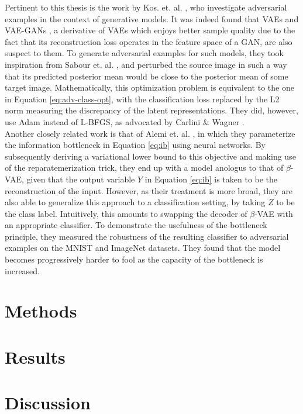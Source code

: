 \documentclass{report}
\begin{document}
\noindent Pertinent to this thesis is the work by Kos. et. al. \cite{kos-gen-adv}, who investigate adversarial examples in the context of generative models. It was indeed found that VAEs and VAE-GANs \cite{vaegan}, a derivative of VAEs which enjoys better sample quality due to the fact that its reconstruction loss operates in the feature space of a GAN, are also suspect to them. To generate adversarial examples for such models, they took inspiration from Sabour et. al. \cite{sabour}, and perturbed the source image in such a way that its predicted posterior mean would be close to the posterior mean of some target image. Mathematically, this optimization problem is equivalent to the one in Equation \ref{eq:adv-class-opt}, with the classification loss replaced by the L2 norm measuring the discrepancy of the latent representations. They did, however, use Adam instead of L-BFGS, as advocated by Carlini \& Wagner \cite{carlini-wagner-16}. \\

\noindent Another closely related work is that of Alemi et. al. \cite{deep-variational-bottleneck}, in which they parameterize the information bottleneck in Equation \ref{eq:ib} using neural networks. By subsequently deriving a variational lower bound to this objective and making use of the reparatemerization trick, they end up with a model anologus to that of $\beta$-VAE, given that the output variable $Y$ in Equation \ref{eq:ib} is taken to be the reconstruction of the input. However, as their treatment is more broad, they are also able to generalize this approach to a classification setting, by taking $Z$ to be the class label. Intuitively, this amounts to swapping the decoder of $\beta$-VAE with an appropriate classifier. To demonstrate the usefulness of the bottleneck principle, they measured the robustness of the resulting classifier to adversarial examples on the MNIST and ImageNet datasets. They found that the model becomes progressively harder to fool as the capacity of the bottleneck is increased.

\chapter{Methods}

\chapter{Results}

\chapter{Discussion}
\end{document}
